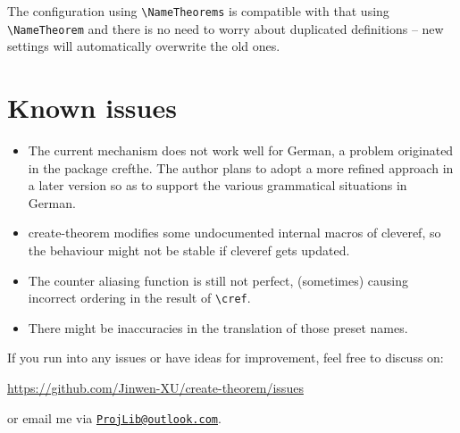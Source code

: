 \documentclass[classical]{einfart}
\newcommand{\createtheorempackage}{\textsf{create-theorem}}
\begin{document}
\medskip
The configuration using \lstinline|\NameTheorems| is compatible with that using \lstinline|\NameTheorem| and there is no need to worry about duplicated definitions -- new settings will automatically overwrite the old ones.


\bigskip
\section{Known issues}

\begin{itemize}
    \item The current mechanism does not work well for German, a problem originated in the package \textsf{crefthe}. The author plans to adopt a more refined approach in a later version so as to support the various grammatical situations in German.
    \item \createtheorempackage{} modifies some undocumented internal macros of \textsf{cleveref}, so the behaviour might not be stable if \textsf{cleveref} gets updated.
    \item The counter aliasing function is still not perfect, (sometimes) causing incorrect ordering in the result of \lstinline|\cref|.
    \item There might be inaccuracies in the translation of those preset names.
\end{itemize}

\medskip
If you run into any issues or have ideas for improvement, feel free to discuss on:
\begin{center}
    \url{https://github.com/Jinwen-XU/create-theorem/issues}
\end{center}
or email me via \href{mailto:ProjLib@outlook.com}{\texttt{ProjLib@outlook.com}}.
\end{document}

